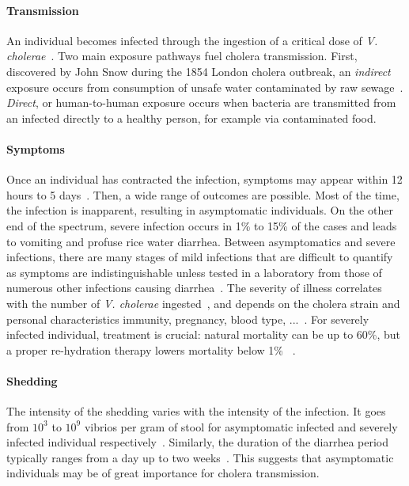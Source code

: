 \paragraph{Transmission} An individual becomes infected through the ingestion of a critical dose of \emph{V. cholerae}~\cite{kaper_cholera._1995}. Two main exposure pathways fuel cholera transmission. First, discovered by John Snow during the 1854 London cholera outbreak, an \textit{indirect} exposure occurs from consumption of unsafe water contaminated by raw sewage~\cite{snow_mode_1855}. %
\textit{Direct}, or human-to-human exposure occurs when bacteria are transmitted from an infected directly to a healthy person, for example via contaminated food.%


\paragraph{Symptoms} Once an individual has contracted the infection, symptoms may appear within 12 hours to 5 days~\cite{azman_incubation_2013}. Then, a wide range of outcomes are possible. Most of the time, the infection is inapparent, resulting in asymptomatic individuals. On the other end of the spectrum, severe infection occurs in 1\% to 15\% of the cases and leads to vomiting and profuse rice water diarrhea. Between asymptomatics and severe infections, there are many stages of mild infections that are difficult to quantify as symptoms are indistinguishable unless tested in a laboratory from those of numerous other infections causing diarrhea~\cite{king_inapparent_2008, kaper_cholera._1995, nelson_cholera_2009, van_de_linde_observations_1965, mccormack_community_1969}.  The severity of illness correlates with the number of \textit{V. cholerae} ingested~\cite{brouwer_dose-response_2017}, and depends on the cholera strain and personal characteristics immunity, pregnancy, blood type, ...~\cite{who_cholera_2017}. For severely infected individual, treatment is crucial: natural mortality can be up to 60\%, but a proper re-hydration therapy lowers mortality below 1\%~\cite{luquero_mortality_2016} .   


\paragraph{Shedding} The intensity of the shedding varies with the intensity of the infection. It goes from $10^3$ to $10^{9}$ vibrios per gram of stool for asymptomatic infected and severely infected individual respectively~\cite{nelson_cholera_2009}. Similarly, the duration of the diarrhea period typically ranges from a day up to two weeks~\cite{nelson_cholera_2009, kaper_cholera._1995}.
This suggests that asymptomatic individuals may be of great importance for cholera transmission. 

